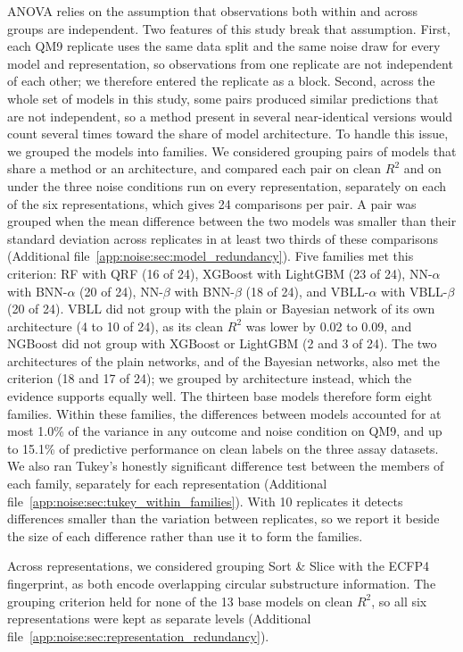 ANOVA relies on the assumption that observations both within and across groups are independent. Two features of this study break that assumption. First, each QM9 replicate uses the same data split and the same noise draw for every model and representation, so observations from one replicate are not independent of each other; we therefore entered the replicate as a block. Second, across the whole set of models in this study, some pairs produced similar predictions that are not independent, so a method present in several near-identical versions would count several times toward the share of model architecture. To handle this issue, we grouped the models into families. We considered grouping pairs of models that share a method or an architecture, and compared each pair on clean $R^2$ and on \aucnorm{} under the three noise conditions run on every representation, separately on each of the six representations, which gives 24 comparisons per pair. A pair was grouped when the mean difference between the two models was smaller than their standard deviation across replicates in at least two thirds of these comparisons (Additional file~\ref{app:noise:sec:model_redundancy}). Five families met this criterion: RF with QRF (16 of 24), XGBoost with LightGBM (23 of 24), NN-$\alpha$ with BNN-$\alpha$ (20 of 24), NN-$\beta$ with BNN-$\beta$ (18 of 24), and VBLL-$\alpha$ with VBLL-$\beta$ (20 of 24). VBLL did not group with the plain or Bayesian network of its own architecture (4 to 10 of 24), as its clean $R^2$ was lower by 0.02 to 0.09, and NGBoost did not group with XGBoost or LightGBM (2 and 3 of 24). The two architectures of the plain networks, and of the Bayesian networks, also met the criterion (18 and 17 of 24); we grouped by architecture instead, which the evidence supports equally well. The thirteen base models therefore form eight families. Within these families, the differences between models accounted for at most 1.0\% of the variance in any outcome and noise condition on QM9, and up to 15.1\% of predictive performance on clean labels on the three assay datasets. We also ran Tukey's honestly significant difference test between the members of each family, separately for each representation (Additional file~\ref{app:noise:sec:tukey_within_families}). With 10 replicates it detects differences smaller than the variation between replicates, so we report it beside the size of each difference rather than use it to form the families.

Across representations, we considered grouping Sort \& Slice with the ECFP4 fingerprint, as both encode overlapping circular substructure information. The grouping criterion held for none of the 13 base models on clean $R^2$, so all six representations were kept as separate levels (Additional file~\ref{app:noise:sec:representation_redundancy}).

